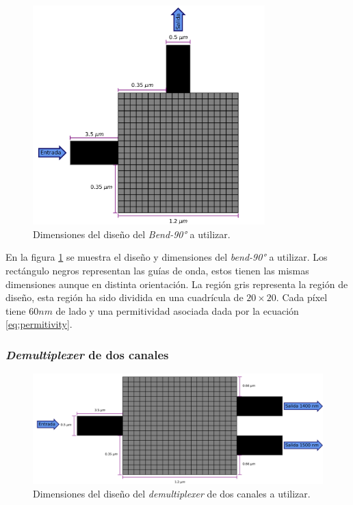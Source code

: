\begin{figure}[ht]
  \centering
  \includegraphics[width=0.8\textwidth]{image/proposal/bend.png}
  \caption{Dimensiones del diseño del \emph{Bend-90°} a utilizar.}
  \label{fig:dimensiones-bend}
\end{figure}

En la figura \ref{fig:dimensiones-bend} se muestra el diseño y dimensiones del \emph{bend-90°} a utilizar.
Los rectángulo negros representan las guías de onda, estos tienen las mismas dimensiones aunque en distinta orientación.
La región gris representa la región de diseño, esta región ha sido dividida en una cuadrícula de $20 \times 20$.
Cada píxel tiene $60 nm$ de lado y una permitividad asociada dada por la ecuación \ref{eq:permitivity}.

\subsubsection{\emph{Demultiplexer} de dos canales}

\begin{figure}[ht]
  \centering
  \includegraphics[width=\textwidth]{image/proposal/demultiplexer.png}
  \caption{Dimensiones del diseño del \emph{demultiplexer} de dos canales a utilizar.}
  \label{fig:dimensiones-demultiplexer}
\end{figure}

